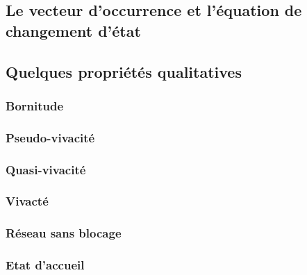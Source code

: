 \documentclass[11pt]{beamer}
\begin{document}
	\subsection{ Le vecteur d’occurrence et l’équation de changement d’état }
		\begin{frame}
	\frametitle{}
	\end{frame}
	\subsection{ Quelques propriétés qualitatives                 }
		\begin{frame}
	\frametitle{}
	\end{frame}
	\subsubsection{ Bornitude                         }
		\begin{frame}
	\frametitle{}
	\end{frame}
	\subsubsection{ Pseudo-vivacité                      }
		\begin{frame}
	\frametitle{}
	\end{frame}
	\subsubsection{ Quasi-vivacité                       }
		\begin{frame}
	\frametitle{}
	\end{frame}
	\subsubsection{ Vivacté                          }
		\begin{frame}
	\frametitle{}
	\end{frame}
	\subsubsection{ Réseau sans blocage                   }
		\begin{frame}
	\frametitle{}
	\end{frame}
	\subsubsection{ Etat d’accueil                       }
		\begin{frame}
	\frametitle{}
	\end{frame}
\end{document}
